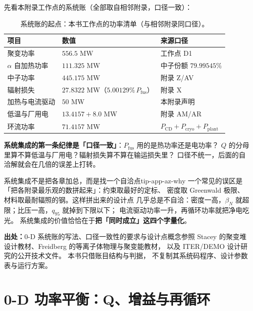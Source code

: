 先看本附录工作点的系统账（全部取自相邻附录，口径一致）：

\begin{table}[htbp]
\centering
\small
\setlength{\tabcolsep}{4pt}
\caption{系统账的起点：本书工作点的功率清单（与相邻附录同口径）。}
\label{tab:app-az-books}
\begin{tabular}{p{4.4cm}p{2.8cm}p{4.0cm}}
\toprule
项目 & 数值 & 来源口径 \\
\midrule
聚变功率 & $556.5$ MW & 工作点 D1 \\
$\alpha$ 自加热功率 & $111.325$ MW & 中子份额 $79.99545\%$ \\
中子功率 & $445.175$ MW & 附录 Z/AV \\
辐射损失 & $27.8322$ MW（$5.00129\%\,P_\mathrm{fus}$） & 附录 X \\
加热与电流驱动 & $50$ MW & 本附录声明 \\
低温与厂用电 & $13.4157+8.0$ MW & 附录 AM/AR \\
环流功率 & $71.4157$ MW & $P_\mathrm{CD}+P_\mathrm{cryo}+P_\mathrm{plant}$ \\
\bottomrule
\end{tabular}

\end{table}

\textbf{系统集成的第一条纪律是「口径一致」}：$P_\mathrm{fus}$ 用的是热功率还是电功率？
$Q$ 的分母里算不算低温与厂用电？辐射损失算不算在输运损失里？
口径不统一，后面的自洽解就会在几倍的误差上打转。

\begin{tip}{系统集成不是把各章加总，而是找一个自洽点}{tip-app-az-why}
一个常见的误区是「把各附录最乐观的数拼起来」：约束取最好的定标、
密度取 Greenwald 极限、材料取最耐辐照的钢。这样拼出来的设计点
几乎总是不自洽：密度一高，$\beta_N$ 就超限；比压一高，$q_{95}$ 就掉到下限以下；
电流驱动功率一升，再循环功率就把净电吃光。
系统集成的价值恰恰在于\textbf{把「同时成立」这四个字量化}。
\end{tip}

{\footnotesize
\textbf{出处：}0-D 系统账的写法、口径一致性的要求与设计点概念参照
Stacey 的聚变堆设计教材、Freidberg 的等离子体物理与聚变能教材，
以及 ITER/DEMO 设计研究的公开技术文件。
本书只借账目结构与判据，
不复制其系统码程序、设计参数表与运行方案。
}

\section{0-D 功率平衡：Q、增益与再循环}
\label{sec:app-az-power}

